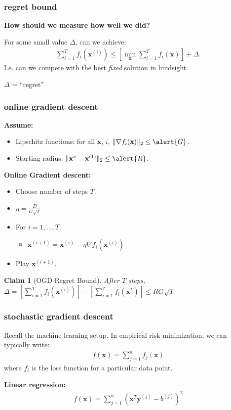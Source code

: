\documentclass[compress]{beamer}
\newcommand{\bv}[1]{\mathbf{#1}}
\newtheorem{claim}[theorem]{Claim}
\begin{document}
\begin{frame}[t]
	\frametitle{regret bound}
	\textbf{How should we measure how well we did?}
	
	For some small value $\Delta$, can we achieve:
	\begin{align*}
	\sum_{i=1}^T f_i(\bv{x}^{(i)}) \leq \left[\min_\bv{x} \sum_{i=1}^T f_i(\bv{x})\right] + \Delta.
	\end{align*}
	I.e. can we compete  with the best \emph{fixed} solution in hindsight.
	\begin{center}
		$\Delta$ = ``regret''
	\end{center}
\end{frame}

\begin{frame}[t]
	\frametitle{online gradient descent}
	\textbf{Assume:}
	\begin{itemize}
		\item Lipschitz functions: for all $\bv{x}$, $i$, $\|\nabla f_i(\bv{x})\|_2 \leq \alert{G}$.
		\item Starting radius: $\|\bv{x}^{*} - \bv{x}^{(1)}\|_2 \leq \alert{R}$.
	\end{itemize}
	
	\textbf{Online Gradient descent:}
	\begin{itemize}
		\item Choose number of steps $T$.
		\item $\eta = \frac{D}{G\sqrt{T}}$
		\item For $i = 1,\ldots, T$:
		\begin{itemize}
			\item $\bv{x}^{(i+1)} = \bv{x}^{(i)} - \eta \nabla f_i(\bv{x}^{(i)})$
		\end{itemize}
		\item Play $\bv{x}^{(i+1)}$. 
	\end{itemize}
	\begin{claim}[OGD Regret Bound]
	After $T$ steps, $\Delta = \left[\sum_{i=1}^T f_i(\bv{x}^{(i)})\right] - \left[\sum_{i=1}^T f_i(\bv{x}^*)\right] \leq RG\sqrt{T}$
	\end{claim}
\end{frame}

\begin{frame}[t]
	\frametitle{stochastic gradient descent}
	Recall the machine learning setup. In empirical risk minimization, we can typically write:
	\begin{align*}
	f(\bv{x}) = \sum_{j=1}^n f_j(\bv{x})
	\end{align*}
	where $f_i$ is the loss function for a particular data point.
	\vspace{1em}
	
	\textbf{Linear regression:}
	\begin{align*}
		f(\bv{x}) = \sum_{j=1}^n (\bv{x}^T\bv{y}^{(j)} - b^{(j)})^2
	\end{align*}
\end{frame}
\end{document}
